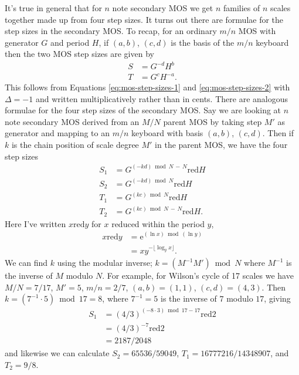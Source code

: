 \documentclass[a4paper,11pt]{article}
\newcommand\red{\mathbin{\mathrm{red}}}
\begin{document}
It's true in general that for $n$ note secondary MOS we get $n$ families of $n$
scales together made up from four step sizes. It turns out there are formulae
for the step sizes in the secondary MOS. To recap, for an ordinary $m/n$ MOS
with generator $G$ and period $H$, if $(a, b)$, $(c, d)$ is the basis of the
$m/n$ keyboard then the two MOS step sizes are given by
\begin{align}
    S   &=  G^{-d} H^{b} \\
    T   &=  G^{c} H^{-a}.
\end{align}
This follows from Equations \ref{eq:mos-step-sizes-1} and
\ref{eq:mos-step-sizes-2} with $\Delta = -1$ and written multiplicatively
rather than in cents. There are analogous formulae for the four step sizes of
the secondary MOS. Say we are looking at $n$ note secondary MOS derived from an
$M/N$ parent MOS by taking step $M'$ as generator and mapping to an $m/n$
keyboard with basis $(a, b)$, $(c, d)$. Then if $k$ is the chain position of
scale degree $M'$ in the parent MOS, we have the four step sizes
\begin{align}
    S_1 &=  G^{(-kd)\bmod N \, - \, N} \red H \\
    S_2 &=  G^{(-kd)\bmod N} \red H \\
    T_1 &=  G^{(kc)\bmod N} \red H \\
    T_2 &=  G^{(kc)\bmod N \, - \, N} \red H.
\end{align}
Here I've written $x \mathbin{\mathrm{red}} y $ for $x$ reduced within the
period $y$,
\begin{align}
    x \red y    &=  \mathrm{e}^{(\ln x) \bmod (\ln y)} \\
                &=  x y^{-\lfloor \log_y x \rfloor}.
\end{align}
We can find $k$ using the modular inverse; $k = (M^{-1} M') \bmod N$ where
$M^{-1}$ is the inverse of $M$ modulo $N$. For example, for Wilson's cycle of
17 scales we have $M/N = 7/17$, $M' = 5$, $m/n = 2/7$, $(a, b) = (1, 1)$, $(c,
d) = (4, 3)$. Then $k = (7^{-1} \cdot 5) \bmod 17 = 8$, where $7^{-1} = 5$ is
the inverse of $7$ modulo $17$, giving
\begin{align}
    S_1 &=  \left(4/3\right)^{(-8 \cdot 3) \bmod 17 - 17} \red 2    \\
        &=  \left(4/3\right)^{-7} \red 2    \\
        &= 2187/2048
\end{align}
and likewise we can calculate $S_2 = 65536/59049$, $T_1 = 16777216/14348907$,
and $T_2 = 9/8$.
\end{document}

